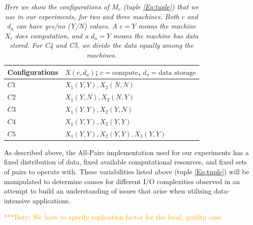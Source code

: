 \documentclass{rspublic}
\newcommand{\betynote}[1]{ {\textcolor{orange} { ***Bety: #1 }}}
\begin{document}
\begin{table}[!h]
\begin{center}
    \begin{tabular}{ | l | l |}
    \hline
    Configurations & $X(c,d_a)$; $c= \mbox{compute}$, $d_a=\mbox{data storage}$  \\ \hline
    $C1$ & $X_1(Y,Y), X_2(N, N)$  \\ \hline
    $C2$ & $X_1(Y,N), X_2(N,Y)$ \\ \hline
    $C3$ & $X_1(Y,Y), X_2(Y,N)$ \\ \hline
    $C4$ & $X_1(Y,Y), X_2(Y,Y)$ \\ \hline
    $C5$ & $X_1(Y,Y), X_2(Y,Y), X_3(Y,Y)$ \\ 
    \hline
    \end{tabular}
\end{center}
    \caption{\textit{Here we show the configurations of $M_c$ (tuple \ref{Eq:tuple}) that we use in our experiments, for two and three machines. Both $c$ and $d_a$ can have yes/no (Y/N) values. A $c = Y$ means the machine $X_i$ does computation, and a $d_a = Y$ means the machine has data stored. For C4 and C5, we divide the data equally among the machines.}}
    \label{Tab:Configs}
\end{table}

As described above, the All-Pairs implementation used for our
experiments has a fixed distribution of data, fixed available
computational resources, and fixed sets of pairs to operate with.
These variabilities listed above (tuple \ref{Eq:tuple}) will be manipulated to determine causes
for different I/O complexities observed in an attempt to build an
understanding of issues that arise when utilising data-intensive
applications. 

\betynote{We have to specify replication factor for the local, gridftp
case}
\end{document}
